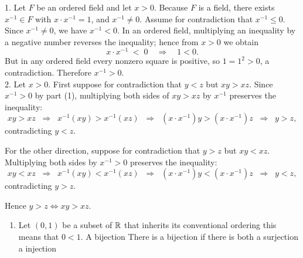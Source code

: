 \documentclass{report}
\begin{document}

\begin{proofWithHibiscus}
  1. Let $F$ be an ordered field and let $x>0$. Because $F$ is a field, there exists
  $x^{-1}\in F$ with $x\cdot x^{-1}=1$, and $x^{-1}\neq 0$.
  Assume for contradiction that $x^{-1}\le 0$. Since $x^{-1}\neq 0$, we have $x^{-1}<0$.
  In an ordered field, multiplying an inequality by a negative number reverses the
  inequality; hence from $x>0$ we obtain
  \[
  x\cdot x^{-1} \;<\; 0 \quad\Longrightarrow\quad 1<0.
  \]
  But in any ordered field every nonzero square is positive, so $1=1^2>0$, a contradiction.
  Therefore $x^{-1}>0$. \\

  2. Let $x>0$. First suppose for contradiction that $y<z$ but $xy > xz$.  
  Since $x^{-1}>0$ by part (1), multiplying both sides of $xy > xz$ by $x^{-1}$ preserves the inequality:
  \[
  xy > xz \;\;\Rightarrow\;\; x^{-1}(xy) > x^{-1}(xz) 
  \;\;\Rightarrow\;\; (x \cdot x^{-1})y > (x \cdot x^{-1})z
  \;\;\Rightarrow\;\; y > z,
  \]
  contradicting $y<z$.
  
  For the other direction, suppose for contradiction that $y>z$ but $xy < xz$. Multiplying both sides by $x^{-1}>0$ preserves the inequality:
  \[
  xy < xz \;\;\Rightarrow\;\; x^{-1}(xy) < x^{-1}(xz)
  \;\;\Rightarrow\;\; (x \cdot x^{-1})y < (x \cdot x^{-1})z
  \;\;\Rightarrow\;\; y < z,
  \]
  contradicting $y>z$.
  
  Hence $y>z \iff xy > xz$.
\end{proofWithHibiscus}


\begin{proofWithHibiscus}
  \begin{enumerate}
    \item Let $(0,1)$ be a subset of $\mathbb{R}$ that inherits its conventional ordering this means that $0 < 1$. A bijection 
      There is a bijection if there is both a surjection a injection 
    
  \end{enumerate}
\end{proofWithHibiscus}
\end{document}
